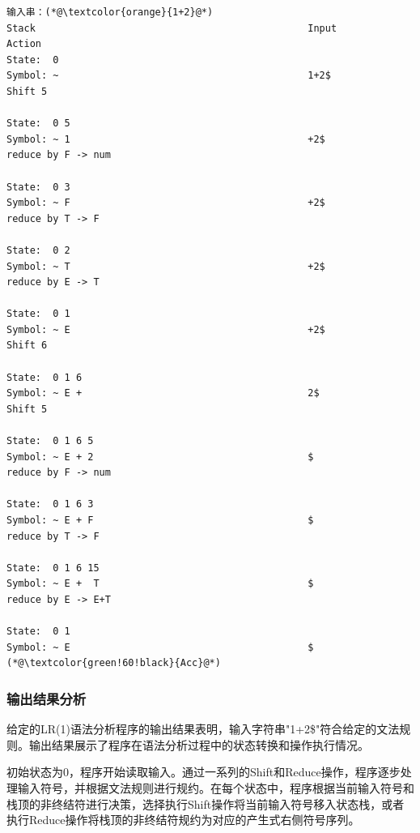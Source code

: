 \documentclass[lang=cn,11pt,a4paper]{elegantpaper}
\begin{document}
\begin{lstlisting}[language=text]
输入串：(*@\textcolor{orange}{1+2}@*)
Stack                                              	Input                          	Action
State:  0                                         
Symbol: ~                                          	1+2$                          	Shift 5

State:  0 5                                       
Symbol: ~ 1                                        	+2$                           	reduce by F -> num

State:  0 3                                       
Symbol: ~ F                                        	+2$                           	reduce by T -> F

State:  0 2                                       
Symbol: ~ T                                        	+2$                           	reduce by E -> T

State:  0 1                                       
Symbol: ~ E                                        	+2$                           	Shift 6

State:  0 1 6                                     
Symbol: ~ E +                                      	2$                            	Shift 5

State:  0 1 6 5                                   
Symbol: ~ E + 2                                    	$                             	reduce by F -> num

State:  0 1 6 3                                   
Symbol: ~ E + F                                    	$                             	reduce by T -> F

State:  0 1 6 15                                  
Symbol: ~ E +  T                                   	$                             	reduce by E -> E+T

State:  0 1                                       
Symbol: ~ E                                        	$                             	(*@\textcolor{green!60!black}{Acc}@*)
\end{lstlisting}


\subsubsection{输出结果分析}

给定的LR(1)语法分析程序的输出结果表明，输入字符串"1+2\$"符合给定的文法规则。输出结果展示了程序在语法分析过程中的状态转换和操作执行情况。

初始状态为0，程序开始读取输入。通过一系列的Shift和Reduce操作，程序逐步处理输入符号，并根据文法规则进行规约。在每个状态中，程序根据当前输入符号和栈顶的非终结符进行决策，选择执行Shift操作将当前输入符号移入状态栈，或者执行Reduce操作将栈顶的非终结符规约为对应的产生式右侧符号序列。
\end{document}
